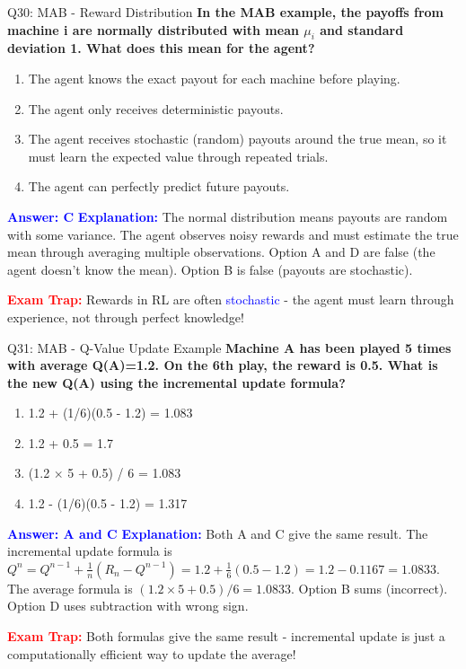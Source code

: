 \documentclass[8pt]{beamer}
\begin{document}
	\begin{frame}{Q30: MAB - Reward Distribution}
		\fontsize{6.5}{7.5}\selectfont
		\textbf{In the MAB example, the payoffs from machine i are normally distributed with mean $\mu_i$ and standard deviation 1. What does this mean for the agent?}
		
		\begin{enumerate}
			\item The agent knows the exact payout for each machine before playing.
			\item The agent only receives deterministic payouts.
			\item The agent receives stochastic (random) payouts around the true mean, so it must learn the expected value through repeated trials.
			\item The agent can perfectly predict future payouts.
		\end{enumerate}
		
		\vspace{0.1cm}
		\textcolor{blue}{\textbf{Answer: C}}
		\vspace{0.1cm}
		\textcolor{blue}{\textbf{Explanation:}} The normal distribution means payouts are random with some variance. The agent observes noisy rewards and must estimate the true mean through averaging multiple observations. Option A and D are false (the agent doesn't know the mean). Option B is false (payouts are stochastic).
		
		\textcolor{red}{\textbf{Exam Trap:}} Rewards in RL are often \textcolor{blue}{stochastic} - the agent must learn through experience, not through perfect knowledge!
	\end{frame}
	
	\begin{frame}{Q31: MAB - Q-Value Update Example}
		\fontsize{6.5}{7.5}\selectfont
		\textbf{Machine A has been played 5 times with average Q(A)=1.2. On the 6th play, the reward is 0.5. What is the new Q(A) using the incremental update formula?}
		
		\begin{enumerate}
			\item 1.2 + (1/6)(0.5 - 1.2) = 1.083
			\item 1.2 + 0.5 = 1.7
			\item (1.2 $\times$ 5 + 0.5) / 6 = 1.083
			\item 1.2 - (1/6)(0.5 - 1.2) = 1.317
		\end{enumerate}
		
		\vspace{0.1cm}
		\textcolor{blue}{\textbf{Answer: A and C}}
		\vspace{0.1cm}
		\textcolor{blue}{\textbf{Explanation:}} Both A and C give the same result. The incremental update formula is $Q^n = Q^{n-1} + \frac{1}{n}(R_n - Q^{n-1}) = 1.2 + \frac{1}{6}(0.5 - 1.2) = 1.2 - 0.1167 = 1.0833$. The average formula is $(1.2 \times 5 + 0.5)/6 = 1.0833$. Option B sums (incorrect). Option D uses subtraction with wrong sign.
		
		\textcolor{red}{\textbf{Exam Trap:}} Both formulas give the same result - incremental update is just a computationally efficient way to update the average!
	\end{frame}
	
\end{document}
